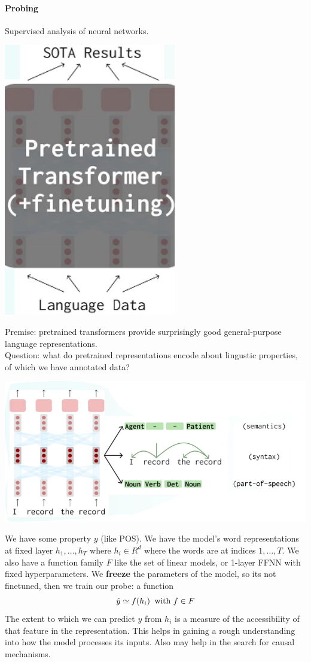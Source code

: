 \documentclass[10pt]{report}
\begin{document}
\paragraph{Probing} Supervised analysis of neural networks.
\begin{center}
	\includegraphics[scale=0.5]{80.png}
\end{center}
Premise: pretrained transformers provide surprisingly good general-purpose language representations.\\
Question: what do pretrained representations encode about lingustic properties, of which we have annotated data?
\begin{center}
	\includegraphics[scale=0.5]{81.png}
\end{center}
We have some property $y$ (like POS). We have the model's word representations at fixed layer $h_1,\ldots,h_T$ where $h_i\in R^d$ where the words are at indices $1,\ldots,T$. We also have a function family $F$ like the set of linear models, or 1-layer FFNN with fixed hyperparameters. We \textbf{freeze} the  parameters of the model, so its not finetuned, then we train our probe: a function $$\hat{y}\simeq f(h_i) \:\hbox{ with } f\in F$$
The extent to which we can predict $y$ from $h_i$ is a measure of the accessibility of that feature in the representation. This helps in gaining a rough understanding into how the model processes its inputs. Also may help in the search for causal mechanisms.
\end{document}
